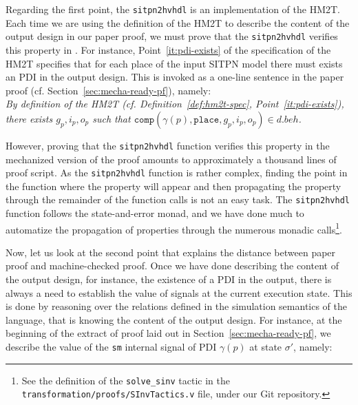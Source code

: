 Regarding the first point, the \texttt{sitpn2hvhdl} is an \coq{}
implementation of the HM2T. Each time we are using the definition of
the HM2T to describe the content of the output design in our paper
proof, we must prove that the \texttt{sitpn2hvhdl} verifies this
property in \coq{}. For instance, Point~\ref{it:pdi-exists} of the
specification of the HM2T specifies that for each place of the input
SITPN model there must exists an PDI in the output design. This is
invoked as a one-line sentence in the
paper proof (cf. Section~\ref{sec:mecha-ready-pf}), namely:\\

\textit{By definition of the HM2T (cf. Definition~\ref{def:hm2t-spec},
  Point~\ref{it:pdi-exists}), there exists $g_p,i_p,o_p$ such that
  $\mathtt{comp}(\gamma(p),\mathtt{place},g_p,i_p,o_p)\in{}d.beh$.}

\bigskip

However, proving that the \texttt{sitpn2hvhdl} function verifies this
property in the mechanized version of the proof amounts to
approximately a thousand lines of proof script. As the
\texttt{sitpn2hvhdl} function is rather complex, finding the point in
the function where the property will appear and then propagating the
property through the remainder of the function calls is not an easy
task.  The \texttt{sitpn2hvhdl} function follows the state-and-error
monad, and we have done much to automatize the propagation of
properties through the numerous monadic calls\footnote{See the
  definition of the \texttt{solve\_sinv} tactic in the
  \texttt{transformation/proofs/SInvTactics.v} file, under our
  \textsf{Git} repository.}.

Now, let us look at the second point that explains the distance
between paper proof and machine-checked proof. Once we have done
describing the content of the output design, for instance, the
existence of a PDI in the output, there is always a need to establish
the value of signals at the current execution state. This is done by
reasoning over the relations defined in the simulation semantics of
the \hvhdl{} language, that is knowing the content of the output
design. For instance, at the beginning of the extract of proof laid
out in Section~\ref{sec:mecha-ready-pf}, we describe the value of the
\texttt{sm} internal signal of PDI $\gamma(p)$ at state
$\sigma'$, namely: \\


